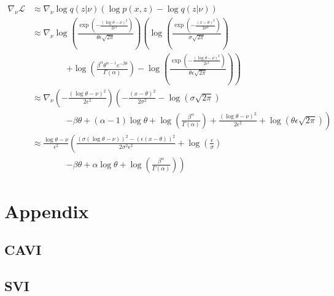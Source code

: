 \documentclass{article}
\begin{document}
\begin{equation}
    \begin{split}
        \nabla_\nu\mathcal{L} & \approx \nabla_\nu \log q(z|\nu) \left(\log p(x, z) - \log q(z|\nu)\right)                                                                                                                                                                 \\
                              & \approx \nabla_\nu\log \left(\frac{\exp\left(-\frac{(\log \theta - \nu)^2}{2\epsilon^2}\right)}{\theta\epsilon\sqrt{2\pi}}\right)\left(\log\left(\frac{\exp\left(-\frac{(x-\theta)^2}{2\sigma^2}\right)}{\sigma\sqrt{2\pi}}\right) \right. \\
                              & \qquad\qquad \left. +\log\left(\frac{\beta^\alpha \theta^{\alpha-1} e^{-\beta \theta}}{\Gamma(\alpha)}\right) -\log \left(\frac{\exp\left(-\frac{(\log \theta - \nu)^2}{2\epsilon^2}\right)}{\theta\epsilon\sqrt{2\pi}}\right)\right)      \\
                              & \approx \nabla_\nu\left(-\frac{(\log \theta - \nu)^2}{2\epsilon^2}\right)\left(-\frac{(x-\theta)^2}{2\sigma^2} - \log\left(\sigma\sqrt{2\pi}\right) \right.                                                                                \\
                              & \qquad\qquad \left. -\beta\theta +(\alpha-1)\log\theta +\log\left(\frac{\beta^\alpha}{\Gamma(\alpha)}\right) +\frac{(\log \theta - \nu)^2}{2\epsilon^2} +\log\left(\theta\epsilon\sqrt{2\pi}\right)\right)                                 \\
                              & \approx \frac{\log \theta - \nu}{\epsilon^2}\left(\frac{(\sigma(\log \theta - \nu))^2-(\epsilon(x-\theta))^2}{2\sigma^2\epsilon^2} +\log\left(\frac{\epsilon}{\sigma}\right) \right.                                                       \\
                              & \qquad\qquad \left. -\beta\theta +\alpha\log\theta +\log\left(\frac{\beta^\alpha}{\Gamma(\alpha)}\right)\right)
    \end{split}
\end{equation}

\newpage
\appendix
\section{Appendix}
\subsection{CAVI}\label{appendix:CAVI}

\subsection{SVI}\label{appendix:SVI}

\end{document}
